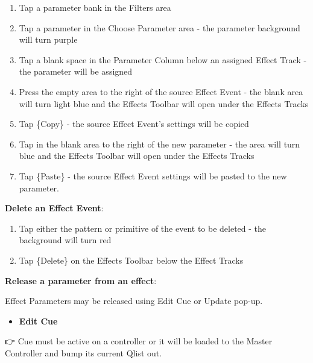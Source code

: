\documentclass[
]{article}
\providecommand{\tightlist}{%
  \setlength{\itemsep}{0pt}\setlength{\parskip}{0pt}}
\begin{document}
\begin{enumerate}
\def\labelenumi{\arabic{enumi}.}
\item
  Tap a parameter bank in the Filters area
\item
  Tap a parameter in the Choose Parameter area - the parameter background will turn purple
\item
  Tap a blank space in the Parameter Column below an assigned Effect Track - the parameter will be assigned
\item
  Press the empty area to the right of the source Effect Event - the blank area will turn light blue and the Effects Toolbar will open under the Effects Tracks
\item
  Tap \{Copy\} - the source Effect Event's settings will be copied
\item
  Tap in the blank area to the right of the new parameter - the area will turn blue and the Effects Toolbar will open under the Effects Tracks
\item
  Tap \{Paste\} - the source Effect Event settings will be pasted to the new parameter.
\end{enumerate}

\textbf{Delete an Effect Event}:

\begin{enumerate}
\def\labelenumi{\arabic{enumi}.}
\item
  Tap either the pattern or primitive of the event to be deleted - the background will turn red
\item
  Tap \{Delete\} on the Effects Toolbar below the Effect Tracks
\end{enumerate}

\textbf{Release a parameter from an effect}:

Effect Parameters may be released using Edit Cue or Update pop-up.

\begin{itemize}
\tightlist
\item
  \textbf{Edit Cue}
\end{itemize}

👉 Cue must be active on a controller or it will be loaded to the Master Controller and bump its current Qlist out.
\end{document}
